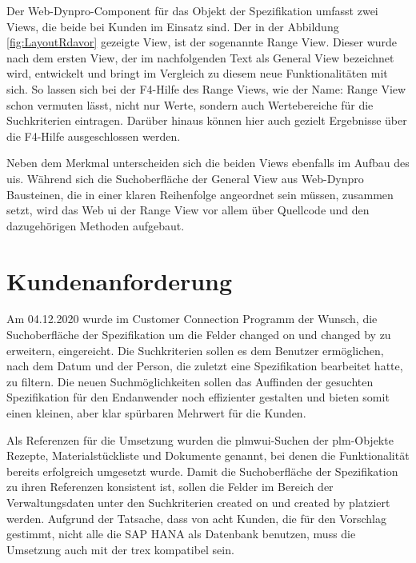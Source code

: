 Der Web-Dynpro-Component für das Objekt der Spezifikation umfasst zwei Views, die beide bei Kunden im Einsatz sind. Der in der Abbildung \ref{fig:LayoutRdavor} gezeigte View, ist der sogenannte Range View. Dieser wurde nach dem ersten View, der im nachfolgenden Text als General View bezeichnet wird, entwickelt und bringt im Vergleich zu diesem neue Funktionalitäten mit sich. So lassen sich bei der F4-Hilfe des Range Views, wie der Name: Range View schon vermuten lässt, nicht nur Werte, sondern auch Wertebereiche für die Suchkriterien eintragen. Darüber hinaus können hier auch gezielt Ergebnisse über die F4-Hilfe ausgeschlossen werden.

Neben dem Merkmal unterscheiden sich die beiden Views ebenfalls im Aufbau des \ac{ui}s. Während sich die Suchoberfläche der General View aus Web-Dynpro Bausteinen, die in einer klaren Reihenfolge angeordnet sein müssen, zusammen setzt, wird das Web \ac{ui} der Range View vor allem über Quellcode und den dazugehörigen Methoden aufgebaut.


\section{Kundenanforderung}

Am 04.12.2020 wurde im Customer Connection Programm der Wunsch, die Suchoberfläche der Spezifikation um die Felder changed on und changed by zu erweitern, eingereicht. Die Suchkriterien sollen es dem Benutzer ermöglichen, nach dem Datum und der Person, die zuletzt eine Spezifikation bearbeitet hatte, zu filtern. Die neuen Suchmöglichkeiten sollen das Auffinden der gesuchten Spezifikation für den Endanwender noch effizienter gestalten und bieten somit einen kleinen, aber klar spürbaren Mehrwert für die Kunden.\autocite[Vgl.][]{ADSESPEC}

Als Referenzen für die Umsetzung wurden die \ac{plmwui}-Suchen der \ac{plm}-Objekte Rezepte, Materialstückliste und Dokumente genannt, bei denen die Funktionalität bereits erfolgreich umgesetzt wurde. Damit die Suchoberfläche der Spezifikation zu ihren Referenzen konsistent ist, sollen die Felder im Bereich der Verwaltungsdaten unter den Suchkriterien created on und created by platziert werden. Aufgrund der Tatsache, dass von acht Kunden, die für den Vorschlag gestimmt, nicht alle die SAP HANA als Datenbank benutzen, muss die Umsetzung auch mit der \acl{trex} kompatibel sein.\autocite[Vgl.][]{ADSESPEC}





